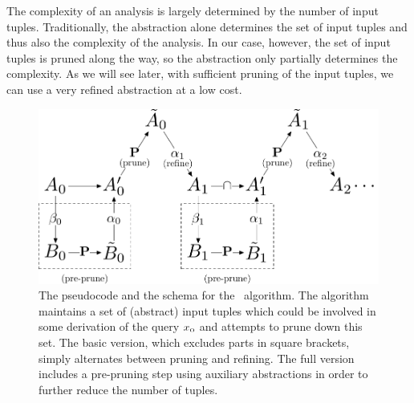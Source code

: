 The complexity of an analysis is largely determined by the number of input
tuples.  Traditionally, the abstraction alone determines the set of input
tuples and thus also the complexity of the analysis.  In our case, however, the set
of input tuples is pruned along the way, so the abstraction only partially
determines the complexity.  As we will see later, with sufficient pruning of
the input tuples, we can use a very refined abstraction at a low cost.


\begin{figure}[t]
\begin{center}  \end{center} %
\includegraphics[scale=0.5]{figures/algorithm}
\caption{\label{fig:pseudocode} The pseudocode and the schema for the \PR\ algorithm.
The algorithm maintains a set of (abstract) input tuples which could be
involved in some derivation of the query $x_\text{\sc o}$ and attempts to prune down this set.
The basic version, which excludes parts in square brackets,
simply alternates between pruning and refining.  The full version includes
a pre-pruning step using auxiliary abstractions in order to further reduce the
number of tuples.
}
\end{figure}

